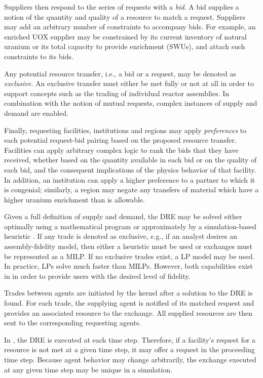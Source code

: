 Suppliers then respond to the series of requests with a \textit{bid}. A bid
supplies a notion of the quantity and quality of a resource to match a
request. Suppliers may add an arbitrary number of constraints to accompany
bids. For example, an enriched \gls{UOX} supplier may be constrained by its current
inventory of natural uranium or its total capacity to provide enrichment (SWUs), and
attach such constraints to its bids. 

Any potential resource transfer, i.e., a bid or a request, may be denoted as
\textit{exclusive}. An exclusive transfer must either be met fully or not at all
in order to support concepts such as the trading of individual reactor
assemblies. In combination with the notion of mutual requests, complex instances
of supply and demand are enabled.

Finally, requesting facilities, institutions and regions may apply
\textit{preferences} to each potential request-bid pairing based on the proposed
resource transfer. Facilities can apply arbitrary complex logic to rank the bids
that they have received, whether based on the quantity available in each bid or
on the quality of each bid, and the consequent implications of the physics behavior
of that facility. In addition, an institution can apply a higher preference to a
partner to which it is congenial; similarly, a region may negate any transfers
of material which have a higher uranium enrichment than is allowable.

Given a full definition of supply and demand, the \gls{DRE} may be solved either
optimally using a mathematical program or approximately by a simulation-based
heuristic \cite{gidden_agent-based_2014}. If any trade is denoted as exclusive, e.g., if an
analyst desires an assembly-fidelity model, then either a heuristic must be used
or exchanges must be represented as a \gls{MILP}. If no exclusive trades exist,
a \gls{LP} model may be used. In practice, LPs solve much faster than
\gls{MILP}s. However, both capabilities exist in \Cyclus in order to
provide users with the desired level of fidelity.

Trades between agents are initiated by the \Cyclus kernel after a solution to
the \gls{DRE} is found. For each trade, the supplying agent is notified of its
matched request and provides an associated resource to the exchange. All
supplied resources are then sent to the corresponding requesting agents.

In \Cyclus, the \gls{DRE} is executed at each time step. Therefore, if a
facility's request for a resource is not met at a given time step, it may offer
a request in the proceeding time step. Because agent behavior may change
arbitrarily, the exchange executed at any given time step may be unique in a
simulation.

